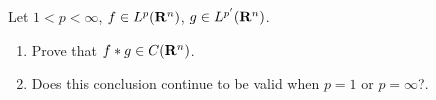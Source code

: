 \begin{problem}
Let $1<p<\infty$, $f\in L^p(\mathbf{R}^n)$, $g\in L^{p'}(\mathbf{R}^n)$.
\begin{enumerate}[label=(\alph*),noitemsep]
\item Prove that $f*g\in C(\mathbf{R}^n)$.
\item Does this conclusion continue to be valid when $p=1$ or $p=\infty$?.
\end{enumerate}
\end{problem}
\begin{solution}
\end{solution}

